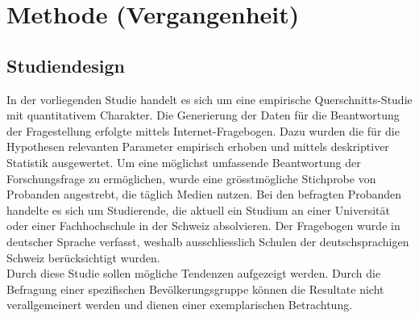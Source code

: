 %
%
\glsresetall
\let\raggedsection\centering 
\chapter{Methode (Vergangenheit)}
\let\raggedsection\raggedright 

\section{Studiendesign}\label{section.studiendesign}
In der vorliegenden Studie handelt es sich um eine empirische Querschnitts-Studie mit quantitativem Charakter. Die Generierung der Daten für die Beantwortung der Fragestellung erfolgte mittels Internet-Fragebogen. Dazu wurden die für die Hypothesen relevanten Parameter empirisch erhoben und mittels deskriptiver Statistik ausgewertet. Um eine möglichst umfassende Beantwortung der Forschungsfrage zu ermöglichen, wurde eine grösstmögliche Stichprobe von Probanden angestrebt, die täglich Medien nutzen. Bei den befragten Probanden handelte es sich um Studierende, die aktuell ein Studium an einer Universität oder einer Fachhochschule in der Schweiz absolvieren. Der Fragebogen wurde in deutscher Sprache verfasst, weshalb ausschliesslich Schulen der deutschsprachigen Schweiz berücksichtigt wurden.\\
Durch diese Studie sollen mögliche Tendenzen aufgezeigt werden. Durch die Befragung einer spezifischen Bevölkerungsgruppe können die Resultate nicht verallgemeinert werden und dienen einer exemplarischen Betrachtung.

